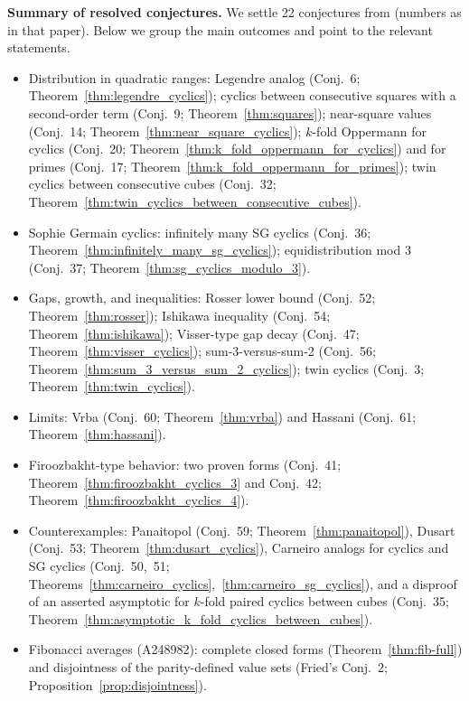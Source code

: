 \documentclass[12pt]{article}
\providecommand{\seqnum}[1]{#1}
\theoremstyle{remark}
\begin{document}
\medskip
\noindent\textbf{Summary of resolved conjectures.}
We settle 22 conjectures from \cite{Cohen2025} (numbers as in that paper). Below we group the main outcomes and point to the relevant statements.
\begin{itemize}
  \item Distribution in quadratic ranges: Legendre analog (Conj.~6; Theorem~\ref{thm:legendre_cyclics}); cyclics between consecutive squares with a second-order term (Conj.~9; Theorem~\ref{thm:squares}); near-square values (Conj.~14; Theorem~\ref{thm:near_square_cyclics}); $k$-fold Oppermann for cyclics (Conj.~20; Theorem~\ref{thm:k_fold_oppermann_for_cyclics}) and for primes (Conj.~17; Theorem~\ref{thm:k_fold_oppermann_for_primes}); twin cyclics between consecutive cubes (Conj.~32; Theorem~\ref{thm:twin_cyclics_between_consecutive_cubes}).
  \item Sophie Germain cyclics: infinitely many SG cyclics (Conj.~36; Theorem~\ref{thm:infinitely_many_sg_cyclics}); equidistribution mod $3$ (Conj.~37; Theorem~\ref{thm:sg_cyclics_modulo_3}).
  \item Gaps, growth, and inequalities: Rosser lower bound (Conj.~52; Theorem~\ref{thm:rosser}); Ishikawa inequality (Conj.~54; Theorem~\ref{thm:ishikawa}); Visser-type gap decay (Conj.~47; Theorem~\ref{thm:visser_cyclics}); sum-3-versus-sum-2 (Conj.~56; Theorem~\ref{thm:sum_3_versus_sum_2_cyclics}); twin cyclics (Conj.~3; Theorem~\ref{thm:twin_cyclics}).
  \item Limits: Vrba (Conj.~60; Theorem~\ref{thm:vrba}) and Hassani (Conj.~61; Theorem~\ref{thm:hassani}).
  \item Firoozbakht-type behavior: two proven forms (Conj.~41; Theorem~\ref{thm:firoozbakht_cyclics_3} and Conj.~42; Theorem~\ref{thm:firoozbakht_cyclics_4}).
  \item Counterexamples: Panaitopol (Conj.~59; Theorem~\ref{thm:panaitopol}), Dusart (Conj.~53; Theorem~\ref{thm:dusart_cyclics}), Carneiro analogs for cyclics and SG cyclics (Conj.~50,~51; Theorems~\ref{thm:carneiro_cyclics},~\ref{thm:carneiro_sg_cyclics}), and a disproof of an asserted asymptotic for $k$-fold paired cyclics between cubes (Conj.~35; Theorem~\ref{thm:asymptotic_k_fold_cyclics_between_cubes}).
  \item Fibonacci averages (\seqnum{A248982}): complete closed forms (Theorem~\ref{thm:fib-full}) and disjointness of the parity-defined value sets (Fried's Conj.~2; Proposition~\ref{prop:disjointness}).
\end{itemize}
\end{document}

